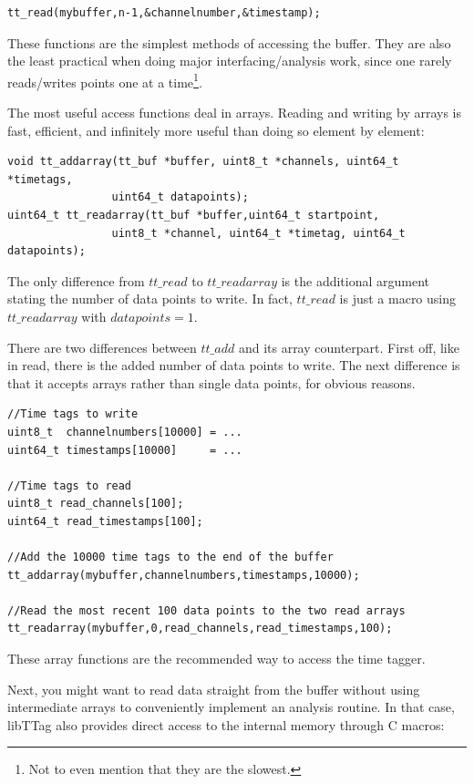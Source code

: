 \documentclass[10pt]{article}
\begin{document}
\begin{verbatim}
tt_read(mybuffer,n-1,&channelnumber,&timestamp);
\end{verbatim}

These functions are the simplest methods of accessing the buffer.
They are also the least practical
when doing major interfacing/analysis work, since one rarely reads/writes 
points one at a time\footnote{Not to even mention that they are the slowest.}.

The most useful access functions deal in arrays. Reading and writing by arrays is fast, efficient,
and infinitely more useful than doing so element by element:

\begin{verbatim}
void tt_addarray(tt_buf *buffer, uint8_t *channels, uint64_t *timetags,
                uint64_t datapoints);
uint64_t tt_readarray(tt_buf *buffer,uint64_t startpoint, 
                uint8_t *channel, uint64_t *timetag, uint64_t datapoints);
\end{verbatim}

The only difference from $tt\_read$ to $tt\_readarray$ is the additional argument stating the number of data points
to write. In fact, $tt\_read$ is just a macro using $tt\_readarray$ with $datapoints=1$.

There are two differences between $tt\_add$ and its array counterpart. First off, like in read, there is
the added number of data points to write. The next difference is that it accepts arrays rather than
single data points, for obvious reasons.

\begin{verbatim}
//Time tags to write
uint8_t  channelnumbers[10000] = ...
uint64_t timestamps[10000]     = ...

//Time tags to read
uint8_t read_channels[100];
uint64_t read_timestamps[100];

//Add the 10000 time tags to the end of the buffer
tt_addarray(mybuffer,channelnumbers,timestamps,10000);

//Read the most recent 100 data points to the two read arrays
tt_readarray(mybuffer,0,read_channels,read_timestamps,100);
\end{verbatim}

These array functions are the recommended way to access the time tagger.

Next, you might want to read data straight from the buffer without using intermediate arrays 
to conveniently implement an analysis routine.
In that case, libTTag also provides direct access to the internal memory through C macros:
\end{document}
